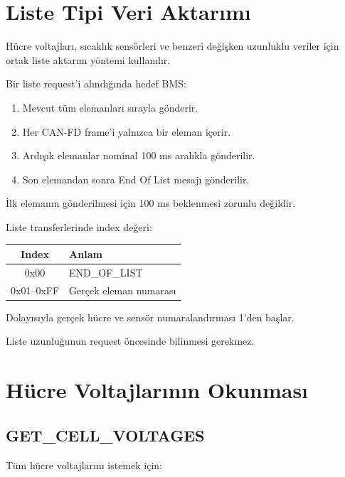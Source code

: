 \documentclass[a4paper,10pt]{article}
\begin{document}
\section{Liste Tipi Veri Aktarımı}

Hücre voltajları, sıcaklık sensörleri ve benzeri değişken uzunluklu
veriler için ortak liste aktarım yöntemi kullanılır.

Bir liste request'i alındığında hedef BMS:

\begin{enumerate}
    \item Mevcut tüm elemanları sırayla gönderir.
    \item Her CAN-FD frame'i yalnızca bir eleman içerir.
    \item Ardışık elemanlar nominal 100 ms aralıkla gönderilir.
    \item Son elemandan sonra End Of List mesajı gönderilir.
\end{enumerate}

İlk elemanın gönderilmesi için 100 ms beklenmesi zorunlu değildir.

Liste transferlerinde index değeri:

\begin{center}
\begin{tabular}{c l}
\toprule
\textbf{Index} & \textbf{Anlam} \\
\midrule
0x00 & END\_OF\_LIST \\
0x01--0xFF & Gerçek eleman numarası \\
\bottomrule
\end{tabular}
\end{center}

Dolayısıyla gerçek hücre ve sensör numaralandırması 1'den başlar.

Liste uzunluğunun request öncesinde bilinmesi gerekmez.

\section{Hücre Voltajlarının Okunması}

\subsection{GET\_CELL\_VOLTAGES}

Tüm hücre voltajlarını istemek için:
\end{document}
